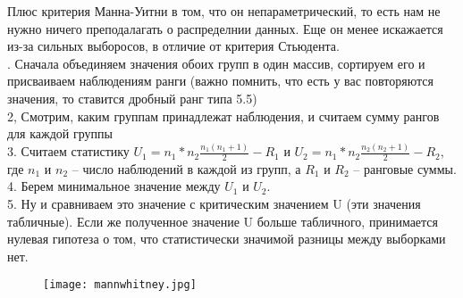 Плюс критерия Манна-Уитни в том, что он непараметрический, то есть нам не нужно ничего преподалагать о распределнии данных. Еще он менее искажается из-за сильных выборосов, в отличие от критерия Стьюдента.\\ 

. Сначала объединяем значения обоих групп в один массив, сортируем его и присваиваем наблюдениям ранги (важно помнить, что есть у вас повторяются значения, то ставится дробный ранг типа 5.5) \\ 
2, Смотрим, каким группам принадлежат наблюдения, и считаем сумму рангов для каждой группы \\ 
3. Считаем статистику $U_{1} = n_{1}*n_{2}\frac{n_{1}(n_{1} + 1)}{2} - R_{1}$ и $U_{2} = n_{1}*n_{2}\frac{n_{2}(n_{2} + 1)}{2} - R_{2}$, где $n_{1}$ и $n_{2}$ -- число наблюдений в каждой из групп, а $R_{1}$ и $R_{2}$ -- ранговые суммы. \\
4. Берем минимальное значение между $U_{1}$ и $U_{2}$. \\ 
5. Ну и сравниваем это значение с критическим значением U (эти значения табличные). Если же полученное значение U больше табличного, принимается нулевая гипотеза о том, что статистически значимой разницы между выборками нет. 

\begin{figure}[H]
	\centering
	\texttt{[image: mannwhitney.jpg]}
\end{figure}
	
